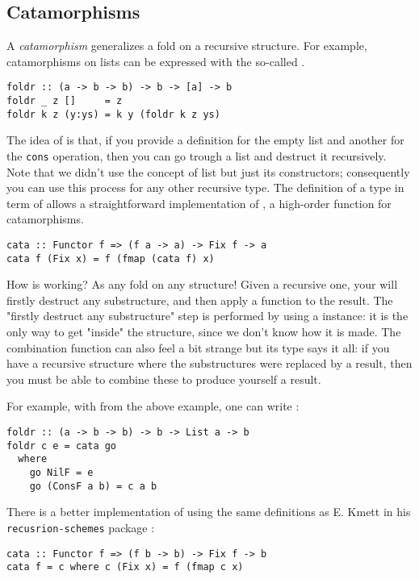 \subsection{Catamorphisms}
A \emph{catamorphism} generalizes a fold on a recursive structure. For example, catamorphisms on lists can be expressed with the so-called .
\begin{verbatim}
foldr :: (a -> b -> b) -> b -> [a] -> b
foldr _ z []     = z
foldr k z (y:ys) = k y (foldr k z ys)
\end{verbatim}
The idea of  is that, if you provide a definition for the empty list and another for the \verb|cons| operation, then you can go trough a list and destruct it recursively. Note that we didn't use the concept of list but just its constructors; consequently you can use this process for any other recursive type. The definition of a type in term of  allows a straightforward implementation of , a high-order function for catamorphisms.

\begin{verbatim}
cata :: Functor f => (f a -> a) -> Fix f -> a
cata f (Fix x) = f (fmap (cata f) x)
\end{verbatim}
\noindent How  is working? As any fold on any structure! Given a recursive one, your will firstly destruct any substructure, and then apply a function to the result. The "firstly destruct any substructure" step is performed by using a  instance: it is the only way to get "inside" the structure, since we don't know how it is made. The combination function can also feel a bit strange but its type says it all: if you have a recursive structure where the substructures were replaced by a result, then you must be able to combine these to produce yourself a result.

For example, with  from the above example, one can write :
\begin{verbatim}
foldr :: (a -> b -> b) -> b -> List a -> b
foldr c e = cata go
  where
    go NilF = e
    go (ConsF a b) = c a b
\end{verbatim}

\noindent There is a better implementation of  using the same definitions as E. Kmett in his \verb|recusrion-schemes| package \cite{ekmett:eschems}:

\begin{verbatim}
cata :: Functor f => (f b -> b) -> Fix f -> b
cata f = c where c (Fix x) = f (fmap c x)
\end{verbatim}

